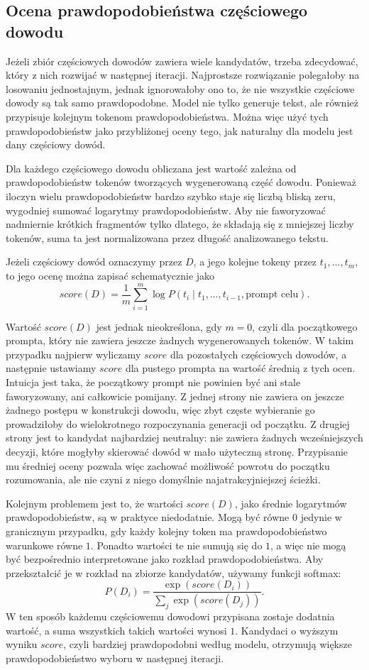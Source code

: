 \documentclass[shortabstract]{iithesis}
\theoremstyle{definition}
\theoremstyle{remark}
\theoremstyle{plain}
\begin{document}
\subsection{Ocena prawdopodobieństwa częściowego dowodu}

Jeżeli zbiór częściowych dowodów zawiera wiele kandydatów, trzeba zdecydować,
który z nich rozwijać w następnej iteracji. Najprostsze rozwiązanie polegałoby na
losowaniu jednostajnym, jednak ignorowałoby ono to, że nie wszystkie częściowe dowody są tak samo prawdopodobne.
Model nie tylko generuje tekst, ale również przypisuje kolejnym tokenom
prawdopodobieństwa. Można więc użyć tych prawdopodobieństw jako przybliżonej
oceny tego, jak naturalny dla modelu jest dany częściowy dowód.

Dla każdego częściowego dowodu obliczana jest wartość zależna od prawdopodobieństw
tokenów tworzących wygenerowaną część dowodu. Ponieważ iloczyn wielu
prawdopodobieństw bardzo szybko staje się liczbą bliską zeru, wygodniej sumować
logarytmy prawdopodobieństw. Aby nie faworyzować nadmiernie krótkich fragmentów
tylko dlatego, że składają się z mniejszej liczby tokenów, suma ta jest normalizowana
przez długość analizowanego tekstu.

Jeżeli częściowy dowód oznaczymy przez \(D\), a jego kolejne tokeny przez
\(t_1,\ldots,t_m\), to jego ocenę można zapisać schematycznie jako
\[
    score(D)
    =
    \frac{1}{m}
    \sum_{i=1}^{m}
    \log P(t_i \mid t_1,\ldots,t_{i-1}, \text{prompt celu}).
\]

Wartość \(score(D)\) jest jednak nieokreślona, gdy \(m=0\), czyli dla początkowego
prompta, który nie zawiera jeszcze żadnych wygenerowanych tokenów. W takim przypadku
najpierw wyliczamy \(score\) dla pozostałych częściowych dowodów, a następnie
ustawiamy \(score\) dla pustego prompta na wartość średnią z tych ocen. Intuicja
jest taka, że początkowy prompt nie powinien być ani stale faworyzowany, ani całkowicie
pomijany. Z jednej strony nie zawiera on jeszcze żadnego postępu w konstrukcji
dowodu, więc zbyt częste wybieranie go prowadziłoby do wielokrotnego rozpoczynania
generacji od początku. Z drugiej strony jest to kandydat najbardziej neutralny:
nie zawiera żadnych wcześniejszych decyzji, które mogłyby skierować dowód w mało
użyteczną stronę. Przypisanie mu średniej oceny pozwala więc zachować możliwość
powrotu do początku rozumowania, ale nie czyni z niego domyślnie najatrakcyjniejszej
ścieżki.


Kolejnym problemem jest to, że wartości \(score(D)\), jako średnie logarytmów
prawdopodobieństw, są w praktyce niedodatnie. Mogą być równe \(0\) jedynie w
granicznym przypadku, gdy każdy kolejny token ma prawdopodobieństwo warunkowe
równe \(1\). Ponadto wartości te nie sumują się do \(1\), a więc nie mogą być
bezpośrednio interpretowane jako rozkład prawdopodobieństwa. Aby przekształcić je
w rozkład na zbiorze kandydatów, używamy funkcji softmax:
\[
    P(D_i)
    =
    \frac{\exp(score(D_i))}
    {\sum_j \exp(score(D_j))}.
\]
W ten sposób każdemu częściowemu dowodowi przypisana zostaje dodatnia wartość,
a suma wszystkich takich wartości wynosi \(1\). Kandydaci o wyższym wyniku
\(score\), czyli bardziej prawdopodobni według modelu, otrzymują większe
prawdopodobieństwo wyboru w następnej iteracji.
\end{document}
